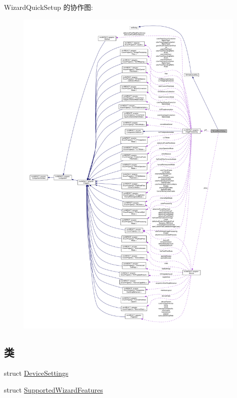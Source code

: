 Wizard\+Quick\+Setup 的协作图\+:
\nopagebreak
\begin{figure}[H]
\begin{center}
\leavevmode
\includegraphics[width=350pt]{class_wizard_quick_setup__coll__graph}
\end{center}
\end{figure}
\subsection*{类}
\begin{DoxyCompactItemize}
\item 
struct \hyperlink{struct_wizard_quick_setup_1_1_device_settings}{Device\+Settings}
\item 
struct \hyperlink{struct_wizard_quick_setup_1_1_supported_wizard_features}{Supported\+Wizard\+Features}
\end{DoxyCompactItemize}
